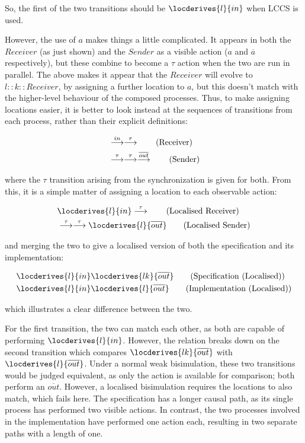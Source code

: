 \noindent So, the first of the two transitions should be
$\locderives{l}{in}$ when LCCS is used.

However, the use of $a$ makes things a little complicated.  It appears
in both the $Receiver$ (as just shown) and the $Sender$ as a visible
action ($a$ and $\overline{a}$ respectively), but these combine to
become a $\tau$ action when the two are run in parallel.  The above
makes it appear that the $Receiver$ will evolve to $l::k::Receiver$, by
assigning a further location to $a$, but this doesn't match with the
higher-level behaviour of the composed processes.  Thus, to make
assigning locations easier, it is better to look instead at the
sequences of transitions from each process, rather than their explicit
definitions:

\begin{align}
& \stackrel{in}{\longrightarrow} \stackrel{\tau}{\longrightarrow} \tag{Receiver} \\
& \stackrel{\tau}{\longrightarrow} \stackrel{\tau}{\longrightarrow} \stackrel{\overline{out}}{\longrightarrow} \tag{Sender}
\end{align}

\noindent where the $\tau$ transition arising from the synchronization
is given for both.  From this, it is a simple matter of assigning a
location to each observable action:

\begin{align}
& \locderives{l}{in} \lderives{\tau} \tag{Localised Receiver} \\
& \lderives{\tau} \lderives{\tau} \locderives{l}{\overline{out}}
\tag{Localised Sender}
\end{align}

and merging the two to give a localised version of both the
specification and its implementation:

\begin{align}
& \locderives{l}{in} \locderives{lk}{\overline{out}} \tag{Specification
(Localised)} \\
& \locderives{l}{in} \locderives{l}{\overline{out}} \tag{Implementation (Localised)}
\end{align}

\noindent which illustrates a clear difference between the two.

For the first transition, the two can match each other, as both are
capable of performing $\locderives{l}{in}$.  However, the relation
breaks down on the second transition which compares $\locderives{lk}{\overline{out}}$
with $\locderives{l}{\overline{out}}$.  Under a normal weak
bisimulation, these two transitions would be judged equivalent, as only
the action is available for comparison; both perform an
$\overline{out}$.  However, a localised bisimulation requires the
locations to also match, which fails here.  The specification has a
longer causal path, as its single process has performed two visible
actions.  In contrast, the two processes involved in the implementation
have performed one action each, resulting in two separate paths with a
length of one.

